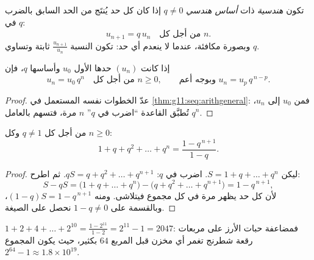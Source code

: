 \begin{definition}\label{def:g11:seq:geometric}
تكون  \emph{هندسية} ذات \emph{أساس
هندسي} $q \neq 0$ إذا كان كل حد يُنتَج من الحد السابق
بالضرب في $q$:
\[
u_{n+1} = q\,u_n \quad \text{من أجل كل } n.
\]
وبصورة مكافئة، عندما لا ينعدم أي حد: تكون النسبة $\frac{u_{n+1}}{u_n}$
ثابتة وتساوي $q$.
\end{definition}

\begin{theorem}\label{thm:g11:seq:geomgeneral}
إذا كانت $(u_n)$  حدها الأول $u_0$ وأساسها $q$، فإن
\[
u_n = u_0\, q^n \quad \text{من أجل كل } n \geq 0,
\qquad\text{وبوجه أعم } u_n = u_p\, q^{\,n-p} .
\]
\end{theorem}

\begin{proof}
عدّ الخطوات نفسه المستعمل في \cref{thm:g11:seq:arithgeneral}: فمن $u_0$ إلى
$u_n$، تُطبَّق القاعدة ``اضرب في $q$'' $n$ مرة، فتسهم
بالعامل $q^n$.
\end{proof}

\begin{theorem}\label{thm:g11:seq:geomsum}
من أجل كل  $q \neq 1$ وكل  $n \geq 0$:
\[
1 + q + q^2 + \dots + q^n = \frac{1 - q^{\,n+1}}{1 - q}.
\]
\end{theorem}

\begin{proof}
ليكن $S = 1 + q + \dots + q^n$. اضرب في $q$:
$qS = q + q^2 + \dots + q^{n+1}$. ثم اطرح:
\[
S - qS = \bigl(1 + q + \dots + q^n\bigr)
- \bigl(q + q^2 + \dots + q^{n+1}\bigr) = 1 - q^{\,n+1},
\]
لأن كل حد  يظهر مرة في كل مجموع فيتلاشى.
ومنه $(1 - q)S = 1 - q^{\,n+1}$، وبالقسمة على $1 - q \neq 0$ نحصل على
الصيغة.
\end{proof}

\begin{example}\label{ex:g11:seq:chessboard}
$1 + 2 + 4 + \dots + 2^{10} = \frac{1 - 2^{11}}{1 - 2} = 2^{11} - 1 =
2047$: فمضاعفة حبات الأرز على مربعات رقعة شطرنج تغمر
أي مخزن قبل المربع $64$ بكثير، حيث يكون المجموع
$2^{64} - 1 \approx 1.8 \times 10^{19}$.
\end{example}

